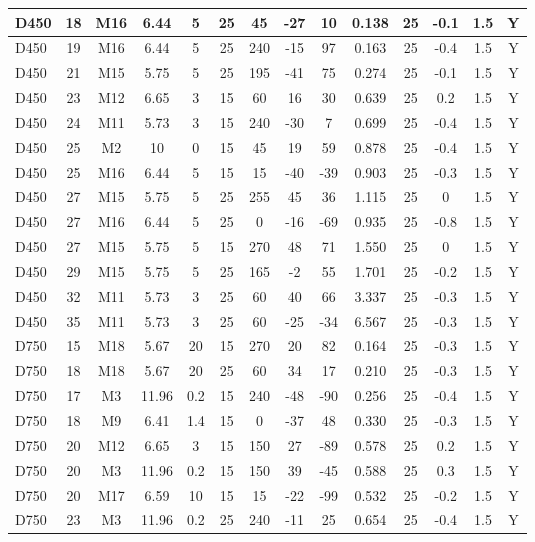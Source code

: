 \documentclass{article}
\begin{document}
\begin{center}
\begin{longtable}{|l|c|c|c|c|c|c|c|c|c|c|c|c|c|}
D450	&	18	&	M16	&	6.44	&	5	&	25	&	45	&	-27	&	10	&	0.138	&	25	&	-0.1	&	1.5	&	Y	\\\hline
D450	&	19	&	M16	&	6.44	&	5	&	25	&	240	&	-15	&	97	&	0.163	&	25	&	-0.4	&	1.5	&	Y	\\\hline
D450	&	21	&	M15	&	5.75	&	5	&	25	&	195	&	-41	&	75	&	0.274	&	25	&	-0.1	&	1.5	&	Y	\\\hline
D450	&	23	&	M12	&	6.65	&	3	&	15	&	60	&	16	&	30	&	0.639	&	25	&	0.2	&	1.5	&	Y	\\\hline
D450	&	24	&	M11	&	5.73	&	3	&	15	&	240	&	-30	&	7	&	0.699	&	25	&	-0.4	&	1.5	&	Y	\\\hline
D450	&	25	&	M2	&	10	&	0	&	15	&	45	&	19	&	59	&	0.878	&	25	&	-0.4	&	1.5	&	Y	\\\hline
D450	&	25	&	M16	&	6.44	&	5	&	15	&	15	&	-40	&	-39	&	0.903	&	25	&	-0.3	&	1.5	&	Y	\\\hline
D450	&	27	&	M15	&	5.75	&	5	&	25	&	255	&	45	&	36	&	1.115	&	25	&	0	&	1.5	&	Y	\\\hline
D450	&	27	&	M16	&	6.44	&	5	&	25	&	0	&	-16	&	-69	&	0.935	&	25	&	-0.8	&	1.5	&	Y	\\\hline
D450	&	27	&	M15	&	5.75	&	5	&	15	&	270	&	48	&	71	&	1.550	&	25	&	0	&	1.5	&	Y	\\\hline
D450	&	29	&	M15	&	5.75	&	5	&	25	&	165	&	-2	&	55	&	1.701	&	25	&	-0.2	&	1.5	&	Y	\\\hline
D450	&	32	&	M11	&	5.73	&	3	&	25	&	60	&	40	&	66	&	3.337	&	25	&	-0.3	&	1.5	&	Y	\\\hline
D450	&	35	&	M11	&	5.73	&	3	&	25	&	60	&	-25	&	-34	&	6.567	&	25	&	-0.3	&	1.5	&	Y	\\\hline
D750	&	15	&	M18	&	5.67	&	20	&	15	&	270	&	20	&	82	&	0.164	&	25	&	-0.3	&	1.5	&	Y	\\\hline
D750	&	18	&	M18	&	5.67	&	20	&	25	&	60	&	34	&	17	&	0.210	&	25	&	-0.3	&	1.5	&	Y	\\\hline
D750	&	17	&	M3	&	11.96	&	0.2	&	15	&	240	&	-48	&	-90	&	0.256	&	25	&	-0.4	&	1.5	&	Y	\\\hline
D750	&	18	&	M9	&	6.41	&	1.4	&	15	&	0	&	-37	&	48	&	0.330	&	25	&	-0.3	&	1.5	&	Y	\\\hline
D750	&	20	&	M12	&	6.65	&	3	&	15	&	150	&	27	&	-89	&	0.578	&	25	&	0.2	&	1.5	&	Y	\\\hline
D750	&	20	&	M3	&	11.96	&	0.2	&	15	&	150	&	39	&	-45	&	0.588	&	25	&	0.3	&	1.5	&	Y	\\\hline
D750	&	20	&	M17	&	6.59	&	10	&	15	&	15	&	-22	&	-99	&	0.532	&	25	&	-0.2	&	1.5	&	Y	\\\hline
D750	&	23	&	M3	&	11.96	&	0.2	&	25	&	240	&	-11	&	25	&	0.654	&	25	&	-0.4	&	1.5	&	Y	\\\hline

\end{longtable}
\end{center}
\end{document}
